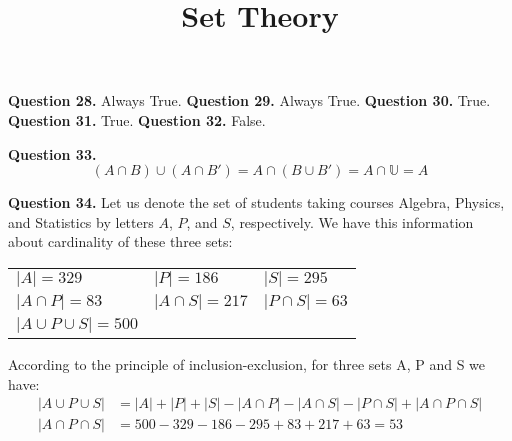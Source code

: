 \documentclass{ximera}
\title{Set Theory}
\begin{document}
\maketitle

\textbf{Question 28.} Always True.
\textbf{Question 29.} Always True.
\textbf{Question 30.} True.
\textbf{Question 31.} True.
\textbf{Question 32.} False.

\textbf{Question 33.} 
\begin{equation*}
(A \cap B) \cup (A \cap B') = A \cap (B \cup B') = A \cap \mathbb{U} = A
\end{equation*}

\textbf{Question 34.}
Let us denote the set of students taking courses Algebra, Physics, and Statistics by letters $A$, $P$, and $S$, respectively. We have this information about cardinality of these three sets:

\begin{tabular}{lll}
 $|A| = 329$ & $|P| = 186$ & $|S| = 295$ \\
 $|A \cap P| = 83$ & $|A \cap S| = 217$ & $|P \cap S| = 63$ \\
 $|A \cup P \cup S| = 500$ &&
\end{tabular}

According to the principle of inclusion-exclusion, for three sets A, P and S we have:
\begin{align*}
|A \cup P \cup S| &= |A| + |P| + |S| - |A \cap P| - |A \cap S| - |P \cap S| + |A \cap P \cap S|\\
|A \cap P \cap S| &= 500 - 329 - 186 - 295 + 83 + 217 + 63 = 53
\end{align*}
\end{document}
